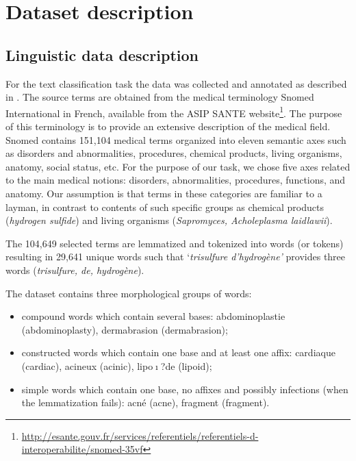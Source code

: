 \chapter{Dataset description}
\label{ch:dataset-description}

\section{Linguistic data description}
\label{sec:linguistic-data-description}

For the text classification task the data was collected and annotated as described in \citep{Grabar-PITR2014}. The source terms are obtained from the medical terminology Snomed International \citep{Cote-93} in French, available from the ASIP SANTE website\footnote{\url{http://esante.gouv.fr/services/referentiels/referentiels-d-interoperabilite/snomed-35vf}}. The purpose of this terminology is to provide an extensive description of the medical field. Snomed contains 151,104 medical terms organized into eleven semantic axes such as disorders and abnormalities, procedures, chemical products, living organisms, anatomy, social status, etc. For the purpose of our task, we chose five axes related to the main medical notions: disorders, abnormalities, procedures, functions, and anatomy. Our assumption is that terms in these categories are familiar to a layman, in contrast to contents of such specific groups as chemical products (\textit{hydrogen sulfide}) and living organisms (\textit{Sapromyces, Acholeplasma laidlawii}).

The 104,649 selected terms are lemmatized and tokenized into words (or tokens) resulting in 29,641 unique words such that `\textit{trisulfure d'hydrog\`{e}ne'} provides three words (\textit{trisulfure, de, hydrog\`{e}ne}).

The dataset contains three morphological groups of words:
\begin{itemize}
    \item  compound words which contain several bases: abdominoplastie (abdominoplasty), dermabrasion (dermabrasion);
    \item  constructed words which contain one base and at least one affix: cardiaque (cardiac), acineux (acinic), lipo$\mathrm{\imath}$?de (lipoid);
    \item  simple words which contain one base, no affixes and possibly infections (when the lemmatization fails): acn\'{e} (acne), fragment (fragment).
\end{itemize}

